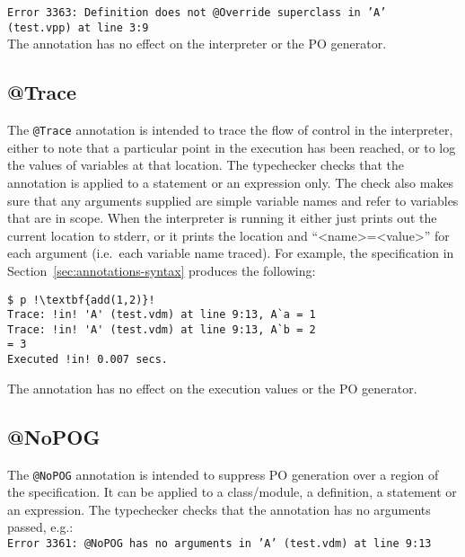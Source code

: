 \noindent \texttt{Error 3363: Definition does not @Override superclass
  in 'A'\\ (test.vpp) at line 3:9}\\

\noindent The annotation has no effect on the interpreter or the PO
generator.

\subsection{@Trace}

The \lstinline[language=VDM++]|@Trace| annotation is intended to trace
the flow of control in the interpreter, either to note that a
particular point in the execution has been reached, or to log the
values of variables at that location. The typechecker checks that the
annotation is applied to a statement or an expression only. The check
also makes sure that any arguments supplied are simple variable names
and refer to variables that are in scope. When the interpreter is
running it either just prints out the current location to stderr, or
it prints the location and
``\textless{}name{}\textgreater{}={}\textless{}value{}\textgreater''
for each argument (i.e.\ each variable name traced). For example, the
specification in Section~\ref{sec:annotations-syntax} produces the
following:

\begin{lstlisting}[style=tool,escapechar=!]
$ p !\textbf{add(1,2)}!
Trace: !in! 'A' (test.vdm) at line 9:13, A`a = 1
Trace: !in! 'A' (test.vdm) at line 9:13, A`b = 2
= 3
Executed !in! 0.007 secs.
\end{lstlisting}

\noindent The annotation has no effect on the execution values or the
PO generator.

\subsection{@NoPOG}

The \lstinline[language=VDM++]|@NoPOG| annotation is intended to
suppress PO generation over a region of the specification. It can be
applied to a class/module, a definition, a statement or an
expression. The typechecker checks
that the annotation has no arguments passed, e.g.:\\

\noindent \texttt{Error 3361: @NoPOG has no arguments in 'A'
  (test.vdm) at line 9:13}\\

